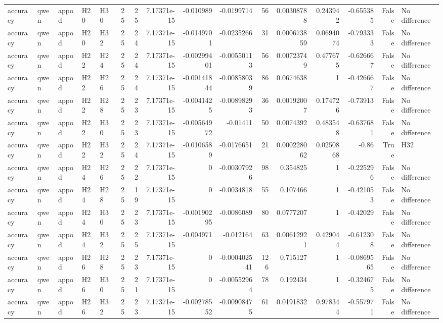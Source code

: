 \begin{longtable}{lllllrrrrrrrrrrl}
accuracy & qwen & appod & H20 & H30 & 25 & 25 & 7.17371e-15 & -0.010989 & -0.0199714 & 56 & 0.00308788 & 0.243942 & -0.655385 & False & No difference \\
accuracy & qwen & appod & H20 & H32 & 25 & 24 & 7.17371e-15 & -0.0149701 & -0.0235266 & 31 & 0.000673859 & 0.0694074 & -0.793333 & False & No difference \\
accuracy & qwen & appod & H22 & H24 & 25 & 24 & 7.17371e-15 & -0.00299401 & -0.00550113 & 56 & 0.00723749 & 0.477675 & -0.626667 & False & No difference \\
accuracy & qwen & appod & H22 & H26 & 25 & 24 & 7.17371e-15 & -0.00141844 & -0.00858039 & 86 & 0.0674638 & 1 & -0.426667 & False & No difference \\
accuracy & qwen & appod & H22 & H28 & 25 & 23 & 7.17371e-15 & -0.0041425 & -0.00898293 & 36 & 0.00192007 & 0.174726 & -0.73913 & False & No difference \\
accuracy & qwen & appod & H22 & H30 & 25 & 23 & 7.17371e-15 & -0.00564972 & -0.01411 & 50 & 0.0074392 & 0.483548 & -0.637681 & False & No difference \\
accuracy & qwen & appod & H22 & H32 & 25 & 24 & 7.17371e-15 & -0.0106589 & -0.0176651 & 21 & 0.000228062 & 0.0250868 & -0.86 & True & H32 \\
accuracy & qwen & appod & H24 & H26 & 25 & 22 & 7.17371e-15 & 0 & -0.00307926 & 98 & 0.354825 & 1 & -0.225296 & False & No difference \\
accuracy & qwen & appod & H24 & H28 & 25 & 19 & 7.17371e-15 & 0 & -0.0034818 & 55 & 0.107466 & 1 & -0.421053 & False & No difference \\
accuracy & qwen & appod & H24 & H30 & 25 & 23 & 7.17371e-15 & -0.00190295 & -0.0086089 & 80 & 0.0777207 & 1 & -0.42029 & False & No difference \\
accuracy & qwen & appod & H24 & H32 & 25 & 25 & 7.17371e-15 & -0.004971 & -0.012164 & 63 & 0.00612921 & 0.429044 & -0.612308 & False & No difference \\
accuracy & qwen & appod & H26 & H28 & 25 & 23 & 7.17371e-15 & 0 & -0.000402541 & 126 & 0.715127 & 1 & -0.0869565 & False & No difference \\
accuracy & qwen & appod & H26 & H30 & 25 & 21 & 7.17371e-15 & 0 & -0.00552964 & 78 & 0.192434 & 1 & -0.324675 & False & No difference \\
accuracy & qwen & appod & H26 & H32 & 25 & 23 & 7.17371e-15 & -0.00278552 & -0.00908475 & 61 & 0.0191832 & 0.978344 & -0.557971 & False & No difference \\

\end{longtable}

